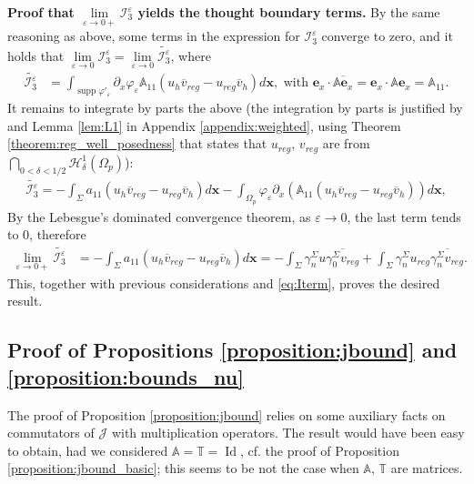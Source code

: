 \documentclass[report]{elsarticle}
\numberwithin{theorem}{section}
\renewcommand{\vec}[1]{\mathbf{#1}}
\newcommand{\re}{\varepsilon}
\begin{document}
\textbf{Proof that 	$\lim\limits_{\varepsilon\rightarrow 0+}\mathcal{I}_3^{\varepsilon}$ yields the thought boundary terms. }By the same reasoning as above, some terms in the expression for $\mathcal{I}_3^{\re}$ converge to zero, and it holds that $\lim\limits_{\varepsilon\rightarrow 0}\mathcal{I}_3^{\varepsilon}=\lim\limits_{\varepsilon\rightarrow 0}\widetilde{\mathcal{I}_3^{\varepsilon}}$, where
	\begin{align*}
		\widetilde{\mathcal{I}_3^{\varepsilon}}&=\int_{\operatorname{supp}\varphi'_{\varepsilon}}\partial_{x}\varphi_{\varepsilon} \mathbb{A}_{11}(u_h\overline{v}_{reg}-u_{reg}\overline{v}_h)d\vec{x}, \text{ with } \vec{e}_x\cdot \overline{\mathbb{A}\vec{e}_x}=\vec{e}_x\cdot \mathbb{A}\vec{e}_x=\mathbb{A}_{11}.
	\end{align*}
It remains to integrate by parts the above  (the integration by parts is justified by \cite[Theorem 1.5.3.1]{grisvard_book} and Lemma \ref{lem:L1} in   Appendix \ref{appendix:weighted}, using Theorem \ref{theorem:reg_well_posedness} that states that $u_{reg}$, $v_{reg}$ are from $\bigcap_{0<\delta<1/2}\mathcal{H}^1_{\delta}(\Omega_p)$):
	\begin{align*}
		\widetilde{\mathcal{I}_3^{\varepsilon}}
		=-\int_{\Sigma}a_{11}(u_h\overline{v}_{reg}-u_{reg}\overline{v}_h)d\vec{x}-\int_{\Omega_p}\varphi_{\varepsilon}\partial_x\left(\mathbb{A}_{11}(u_h\overline{v}_{reg}-u_{reg}\overline{v}_h)\right)d\vec{x},
	\end{align*}
By the Lebesgue's dominated convergence theorem, as $\re\rightarrow 0$, the last term tends to $0$, therefore
	\begin{align*}
		\lim\limits_{\varepsilon\rightarrow 0+}	\widetilde{\mathcal{I}_3^{\varepsilon}}&=
		-\int_{\Sigma}a_{11}(u_h\overline{v}_{reg}-u_{reg}\overline{v}_h)d\vec{x}=-\int_{\Sigma}\gamma_n^{\Sigma}u\overline{\gamma_0^{\Sigma} v_{reg}}+\int_{\Sigma}\gamma_n^{\Sigma}u_{reg}\overline{\gamma_n^{\Sigma} v_{reg}}.
	\end{align*}
This, together with previous considerations and \eqref{eq:Iterm}, proves the desired result. 

\subsection{Proof of Propositions \ref{proposition:jbound} and \ref{proposition:bounds_nu}}
\label{appendix:commutators}
The proof of Proposition \ref{proposition:jbound} relies on some auxiliary facts on commutators of $\mathcal{J}$ with multiplication operators. The result would have been easy to obtain, had we considered $\mathbb{A}=\mathbb{T}=\operatorname{Id}$, cf. the proof of Proposition \ref{proposition:jbound_basic}; this seems to be not the case when $\mathbb{A}, \, \mathbb{T}$ are matrices. 
 
\end{document}
